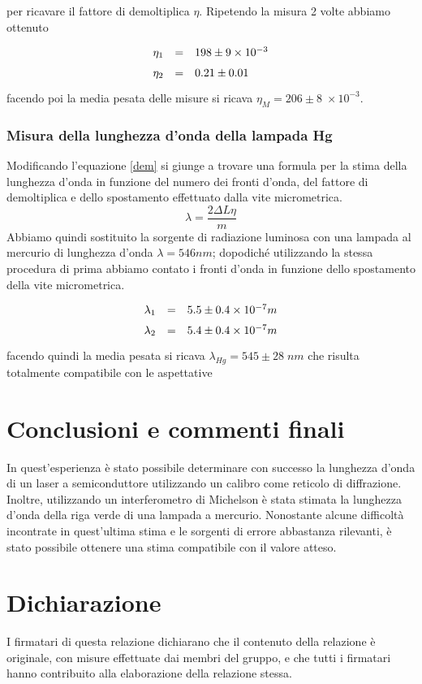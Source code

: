 \documentclass[10pt, a4paper, italian]{article}
\begin{document}
per ricavare il fattore di demoltiplica $\eta$.
Ripetendo la misura 2 volte abbiamo ottenuto 
  \[
\def\arraystretch{1.5}
\begin{array}{rcl}
\eta_1 & = & 198 \pm 9 \times 10^{-3}\\
\eta_2 & = & 0.21 \pm 0.01\\
\end{array}
\]
facendo poi la media pesata delle misure si ricava $\eta_M =206 \pm 8 \; \times 10^{-3}$.

\subsubsection{Misura della lunghezza d'onda della lampada Hg}
Modificando l'equazione \ref{dem} si giunge a trovare una formula per la stima della lunghezza d'onda in funzione del numero dei fronti d'onda, del fattore di demoltiplica e dello spostamento effettuato dalla vite micrometrica.
\[
\lambda=\frac{2\Delta L \eta}{m}
\]
Abbiamo quindi sostituito la sorgente di radiazione luminosa con una lampada al mercurio di lunghezza d'onda $\lambda=546 nm$; dopodiché utilizzando la stessa procedura di prima abbiamo contato i fronti d'onda in funzione dello spostamento della vite micrometrica.
  \[
\def\arraystretch{1.5}
\begin{array}{rcl}
\lambda_1 & = & 5.5 \pm 0.4 \times 10^{-7} m\\
\lambda_2 & = & 5.4 \pm 0.4 \times 10^{-7} m\\
\end{array}
\]
facendo quindi la media pesata si ricava $\lambda _{Hg}=545\pm 28 \; nm$ che risulta totalmente compatibile con le aspettative
\section*{Conclusioni e commenti finali}
In quest'esperienza è stato possibile determinare con successo la lunghezza d'onda di un laser a semiconduttore utilizzando un calibro come reticolo di diffrazione. Inoltre, utilizzando un interferometro di Michelson è stata stimata la lunghezza d'onda della riga verde di una lampada a mercurio. Nonostante alcune difficoltà incontrate in quest'ultima stima e le sorgenti di errore abbastanza rilevanti, è stato possibile ottenere una stima compatibile con il valore atteso.

\section*{Dichiarazione}
I firmatari di questa relazione dichiarano che il contenuto della relazione \`e
originale, con misure effettuate dai membri del gruppo, e che tutti i firmatari
hanno contribuito alla elaborazione della relazione stessa.
\end{document}
